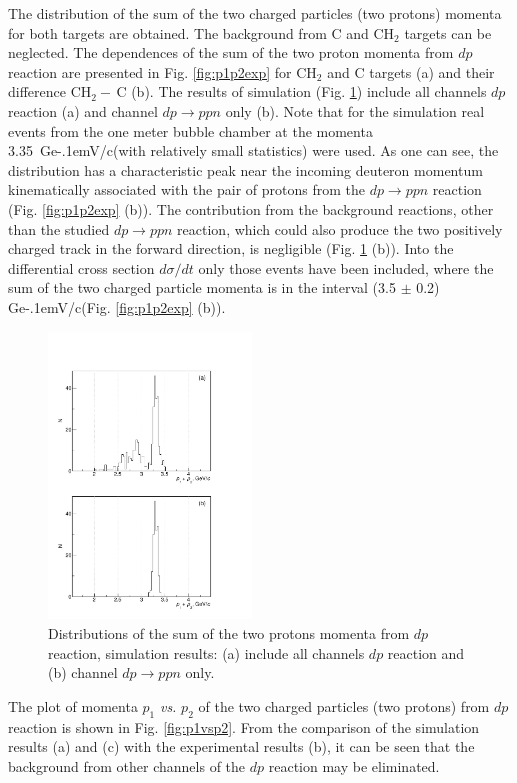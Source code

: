 \documentclass[twocolumn,epjc3]{svjour3}
\newcommand{\dpfrag} {\ensuremath{dp \rightarrow ppn}\xspace}
\newcommand{\dpchex} {\ensuremath{dp \rightarrow (pp)n}\xspace}
\newcommand{\GeVc}   {Ge\kern-.1emV/c\xspace}
\begin{document}
The distribution of the sum of the two charged particles (two protons) momenta
for both targets are obtained. The background from C and CH$_2$ targets can be
neglected. The dependences of the sum of the two proton momenta from $dp$
reaction are presented in Fig. \ref{fig:p1p2exp} for CH$_2$ and C targets (a)
and their difference CH$_2-\,$C (b). The results of simulation
(Fig. \ref{fig:p1p2sim}) include all channels $dp$ reaction (a) and channel
\dpfrag only (b). Note that for the simulation real events from the one meter
bubble chamber at the momenta 3.35~\GeVc (with relatively small statistics) were
used. As one can see, the distribution has a characteristic peak near the
incoming deuteron momentum kinematically associated with the pair of protons
from the \dpfrag reaction (Fig. \ref{fig:p1p2exp} (b)). The contribution from
the background reactions, other than the studied \dpfrag reaction, which could
also produce the two positively charged track in the forward direction, is
negligible (Fig. \ref{fig:p1p2sim} (b)). Into the differential cross section
$d\sigma/dt$
only those events have been included, where the sum of the two charged particle
momenta is in the interval (3.5 $\pm$ 0.2) \GeVc (Fig. \ref{fig:p1p2exp} (b)).

\begin{figure}[h]
  \centering
  \includegraphics[width=0.48\textwidth]{p1_plus_p2_2.pdf}
  \caption{Distributions of the sum of the two protons momenta from $dp$
    reaction, simulation results: (a) include all channels $dp$ reaction and (b)
    channel \dpfrag only.}
  \label{fig:p1p2sim}
\end{figure}

The plot of momenta $p_1$ \textit{vs.} $p_2$ of the two charged particles (two
protons) from $dp$ reaction is shown in Fig. \ref{fig:p1vsp2}. From the
comparison of the simulation results (a) and (c) with the experimental results
(b), it can be seen that the background from other channels of the $dp$ reaction
may be eliminated.
\end{document}
